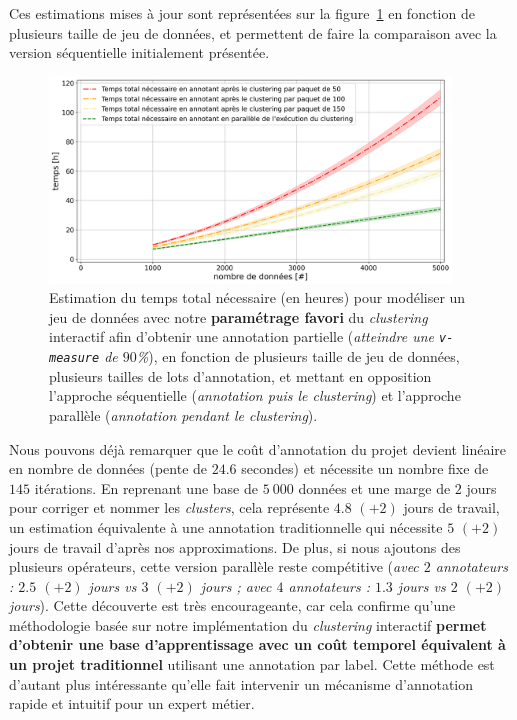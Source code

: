 			Ces estimations mises à jour sont représentées sur la figure~\ref{figure:4.3.4-ETUDE-COUT-TOTAL} en fonction de plusieurs taille de jeu de données, et permettent de faire la comparaison avec la version séquentielle initialement présentée.
			
			\begin{figure}[!htb]
				\centering
				\includegraphics[width=0.95\textwidth]{figures/etude-temps-total-2-modelisation-parallele}
				\caption{Estimation du temps total nécessaire (en heures) pour modéliser un jeu de données avec notre \textbf{paramétrage favori} du \textit{clustering} interactif afin d'obtenir une annotation partielle (\textit{atteindre une \texttt{v-measure} de $90$\%}), en fonction de plusieurs taille de jeu de données, plusieurs tailles de lots d'annotation, et mettant en opposition l'approche séquentielle (\textit{annotation puis le clustering}) et l'approche parallèle (\textit{annotation pendant le clustering}).}
				\label{figure:4.3.4-ETUDE-COUT-TOTAL}
			\end{figure}
			
			Nous pouvons déjà remarquer que le coût d'annotation du projet devient linéaire en nombre de données (pente de $24.6$ secondes) et nécessite un nombre fixe de $145$ itérations.
			En reprenant une base de $5~000$ données et une marge de $2$ jours pour corriger et nommer les \textit{clusters}, cela représente $4.8$ {\footnotesize $(+2)$} jours de travail, un estimation équivalente à une annotation traditionnelle qui nécessite $5 $ {\footnotesize $(+2)$} jours de travail d'après nos approximations.
			De plus, si nous ajoutons des plusieurs opérateurs, cette version parallèle reste compétitive (\textit{avec $2$ annotateurs : $2.5$ {\footnotesize $(+2)$} jours vs $3$ {\footnotesize $(+2)$} jours ; avec $4$ annotateurs : $1.3$ jours vs $2$ {\footnotesize $(+2)$} jours}).
			Cette découverte est très encourageante, car cela confirme qu'une méthodologie basée sur notre implémentation du \textit{clustering} interactif \textbf{permet d'obtenir une base d'apprentissage avec un coût temporel équivalent à un projet traditionnel} utilisant une annotation par label.
			Cette méthode est d'autant plus intéressante qu'elle fait intervenir un mécanisme d'annotation rapide et intuitif pour un expert métier.
			
